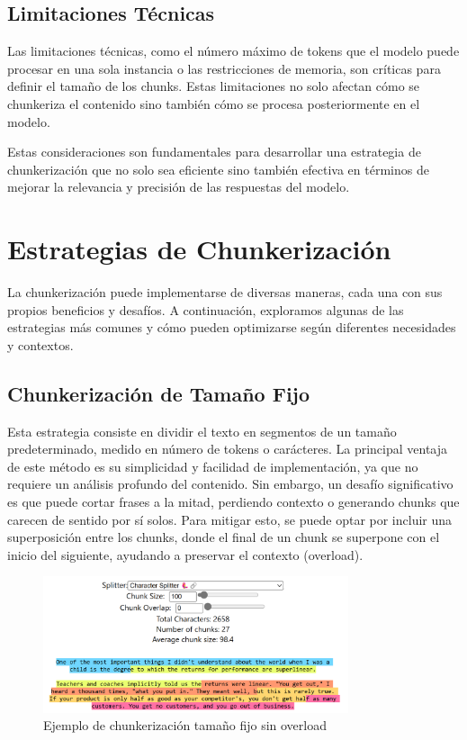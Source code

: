\subsection{Limitaciones Técnicas}
Las limitaciones técnicas, como el número máximo de tokens que el modelo puede procesar en una sola instancia o las restricciones de memoria, son críticas para definir el tamaño de los chunks. Estas limitaciones no solo afectan cómo se chunkeriza el contenido sino también cómo se procesa posteriormente en el modelo.

Estas consideraciones son fundamentales para desarrollar una estrategia de chunkerización que no solo sea eficiente sino también efectiva en términos de mejorar la relevancia y precisión de las respuestas del modelo.

\section{Estrategias de Chunkerización}

La chunkerización puede implementarse de diversas maneras, cada una con sus propios beneficios y desafíos. A continuación, exploramos algunas de las estrategias más comunes y cómo pueden optimizarse según diferentes necesidades y contextos.

\subsection{Chunkerización de Tamaño Fijo}

Esta estrategia consiste en dividir el texto en segmentos de un tamaño predeterminado, medido en número de tokens o carácteres. La principal ventaja de este método es su simplicidad y facilidad de implementación, ya que no requiere un análisis profundo del contenido. Sin embargo, un desafío significativo es que puede cortar frases a la mitad, perdiendo contexto o generando chunks que carecen de sentido por sí solos. Para mitigar esto, se puede optar por incluir una superposición entre los chunks, donde el final de un chunk se superpone con el inicio del siguiente, ayudando a preservar el contexto (overload).

\begin{figure}[h]
\centering
\includegraphics[width=0.8\textwidth]{figuras/capitulo4/character_splitter_100_0.png}
\caption{Ejemplo de chunkerización tamaño fijo sin overload}
\label{fig:imagen_fijo}
\end{figure}

